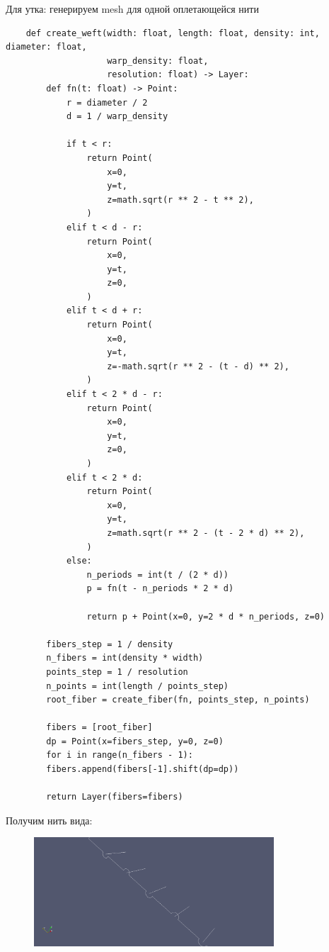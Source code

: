 Для утка: генерируем mesh для одной оплетающейся нити
\begin{verbatim}
    def create_weft(width: float, length: float, density: int, diameter: float,
                    warp_density: float,
                    resolution: float) -> Layer:
        def fn(t: float) -> Point:
            r = diameter / 2
            d = 1 / warp_density

            if t < r:
                return Point(
                    x=0,
                    y=t,
                    z=math.sqrt(r ** 2 - t ** 2),
                )
            elif t < d - r:
                return Point(
                    x=0,
                    y=t,
                    z=0,
                )
            elif t < d + r:
                return Point(
                    x=0,
                    y=t,
                    z=-math.sqrt(r ** 2 - (t - d) ** 2),
                )
            elif t < 2 * d - r:
                return Point(
                    x=0,
                    y=t,
                    z=0,
                )
            elif t < 2 * d:
                return Point(
                    x=0,
                    y=t,
                    z=math.sqrt(r ** 2 - (t - 2 * d) ** 2),
                )
            else:
                n_periods = int(t / (2 * d))
                p = fn(t - n_periods * 2 * d)

                return p + Point(x=0, y=2 * d * n_periods, z=0)

        fibers_step = 1 / density
        n_fibers = int(density * width)
        points_step = 1 / resolution
        n_points = int(length / points_step)
        root_fiber = create_fiber(fn, points_step, n_points)

        fibers = [root_fiber]
        dp = Point(x=fibers_step, y=0, z=0)
        for i in range(n_fibers - 1):
        fibers.append(fibers[-1].shift(dp=dp))

        return Layer(fibers=fibers)
\end{verbatim}

Получим нить вида:
\begin{figure}[H]
    \centering
    \includegraphics[width=0.8\textwidth]{img/weft_fiber.png}
\end{figure}

